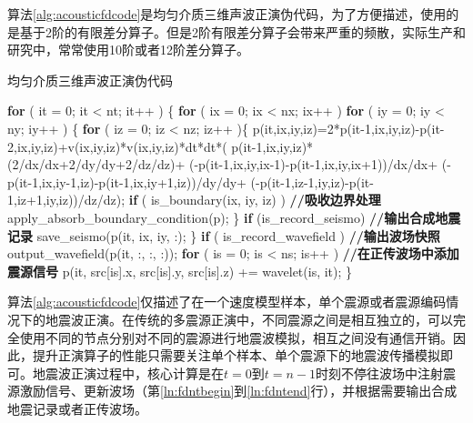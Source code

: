 算法\ref{alg:acousticfdcode}是均匀介质三维声波正演伪代码，为了方便描述，使用的是基于2阶的有限差分算子\cite{fu2011eliminating}。但是2阶有限差分算子会带来严重的频散，实际生产和研究中，常常使用10阶或者12阶差分算子。

\begin{algorithm}[ht]
\small
\caption{均匀介质三维声波正演伪代码}\label{alg:acousticfdcode}
\begin{algorithmic}[1]
\State \textbf{for} ( it = 0; it < nt; it++ ) \{ \label{ln:fdntbegin}
\State \quad\quad \textbf{for} ( ix = 0; ix < nx; ix++ )
\State \quad\quad\quad\quad \textbf{for} ( iy = 0; iy < ny; iy++ ) \{
\State \quad\quad\quad\quad\quad\quad \textbf{for} ( iz = 0; iz < nz; iz++ )\{
\State \quad\quad\quad\quad\quad\quad\quad\quad  p(it,ix,iy,iz)=2*p(it-1,ix,iy,iz)-p(it-2,ix,iy,iz)+v(ix,iy,iz)*v(ix,iy,iz)*dt*dt*(
\State \quad\quad\quad\quad\quad\quad\quad\quad\quad\quad\quad\quad\quad\quad\quad                                    p(it-1,ix,iy,iz)*(2/dx/dx+2/dy/dy+2/dz/dz)+
\State \quad\quad\quad\quad\quad\quad\quad\quad\quad\quad\quad\quad\quad\quad\quad                                    (-p(it-1,ix,iy,ix-1)-p(it-1,ix,iy,ix+1))/dx/dx+
\State \quad\quad \quad\quad\quad\quad\quad\quad\quad\quad\quad\quad\quad\quad\quad                                    (-p(it-1,ix,iy-1,iz)-p(it-1,ix,iy+1,iz))/dy/dy+
\State \quad\quad\quad\quad\quad\quad\quad\quad\quad\quad\quad\quad\quad\quad\quad                                    (-p(it-1,iz-1,iy,iz)-p(it-1,iz+1,iy,iz))/dz/dz);
\State
\State \quad\quad\quad\quad\quad\quad\quad\quad \textbf{if} ( is\_boundary(ix, iy, iz) ) \textbf{//吸收边界处理} \label{ln:fdboundary}
\State \quad\quad\quad\quad\quad\quad\quad\quad\quad\quad\quad    apply\_absorb\_boundary\_condition(p);
\State \quad\quad\quad\quad\quad\quad                \} \label{ln:fdntend}
\State \quad\quad\quad\quad\quad\quad \textbf{if} (is\_record\_seismo) \textbf{//输出合成地震记录}
\State \quad\quad\quad\quad\quad\quad\quad\quad save\_seismo(p(it, ix, iy, :);
\State \quad\quad\quad\quad \}
\State
\State \quad\quad \textbf{if} ( is\_record\_wavefield ) \textbf{//输出波场快照}
\State \quad\quad\quad\quad output\_wavefield(p(it, :, :, :));
\State
\State \quad\quad \textbf{for} ( is = 0; is < ns; is++ ) \textbf{//在正传波场中添加震源信号}
\State \quad\quad\quad\quad p(it, src[is].x, src[is].y, src[is].z) += wavelet(is, it);
\State \}
\end{algorithmic}
\end{algorithm}

算法\ref{alg:acousticfdcode}仅描述了在一个速度模型样本，单个震源或者震源编码情况下的地震波正演。在传统的多震源正演中，不同震源之间是相互独立的，可以完全使用不同的节点分别对不同的震源进行地震波模拟，相互之间没有通信开销。因此，提升正演算子的性能只需要关注单个样本、单个震源下的地震波传播模拟即可。地震波正演过程中，核心计算是在$t=0$到$t=n-1$时刻不停往波场中注射震源激励信号、更新波场（第\ref{ln:fdntbegin}到\ref{ln:fdntend}行），并根据需要输出合成地震记录或者正传波场。

